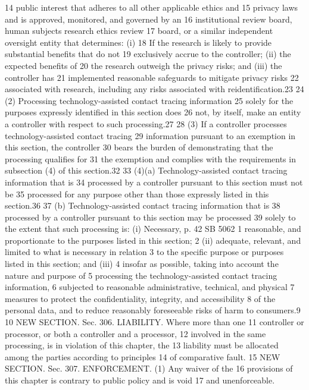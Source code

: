 14 public interest that adheres to all other applicable ethics and
15 privacy laws and is approved, monitored, and governed by an
16 institutional review board, human subjects research ethics review
17 board, or a similar independent oversight entity that determines: (i)
18 If the research is likely to provide substantial benefits that do not
19 exclusively accrue to the controller; (ii) the expected benefits of
20 the research outweigh the privacy risks; and (iii) the controller has
21 implemented reasonable safeguards to mitigate privacy risks
22 associated with research, including any risks associated with
reidentification.23
24 (2) Processing technology-assisted contact tracing information
25 solely for the purposes expressly identified in this section does
26 not, by itself, make an entity a controller with respect to such
processing.27
28 (3) If a controller processes technology-assisted contact tracing
29 information pursuant to an exemption in this section, the controller
30 bears the burden of demonstrating that the processing qualifies for
31 the exemption and complies with the requirements in subsection (4) of
this section.32
33 (4)(a) Technology-assisted contact tracing information that is
34 processed by a controller pursuant to this section must not be
35 processed for any purpose other than those expressly listed in this
section.36
37 (b) Technology-assisted contact tracing information that is
38 processed by a controller pursuant to this section may be processed
39 solely to the extent that such processing is: (i) Necessary,
p. 42 SB 5062
1 reasonable, and proportionate to the purposes listed in this section;
2 (ii) adequate, relevant, and limited to what is necessary in relation
3 to the specific purpose or purposes listed in this section; and (iii)
4 insofar as possible, taking into account the nature and purpose of
5 processing the technology-assisted contact tracing information,
6 subjected to reasonable administrative, technical, and physical
7 measures to protect the confidentiality, integrity, and accessibility
8 of the personal data, and to reduce reasonably foreseeable risks of
harm to consumers.9
10 NEW SECTION. Sec. 306. LIABILITY. Where more than one
11 controller or processor, or both a controller and a processor,
12 involved in the same processing, is in violation of this chapter, the
13 liability must be allocated among the parties according to principles
14 of comparative fault.
15 NEW SECTION. Sec. 307. ENFORCEMENT. (1) Any waiver of the
16 provisions of this chapter is contrary to public policy and is void
17 and unenforceable.
